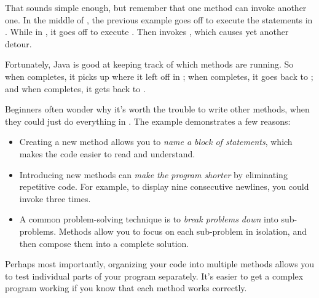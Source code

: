 That sounds simple enough, but remember that one method can invoke another one.
In the middle of , the previous example goes off to execute the statements in .
While in , it goes off to execute .
Then  invokes , which causes yet another detour.

Fortunately, Java is good at keeping track of which methods are running.
So when  completes, it picks up where it left off in ; when  completes, it goes back to ; and when  completes, it gets back to .



Beginners often wonder why it's worth the trouble to write other methods, when they could just do everything in .
The  example demonstrates a few reasons:

\begin{itemize}

\item Creating a new method allows you to {\em name a block of statements}, which makes the code easier to read and understand.

\item Introducing new methods can {\em make the program shorter} by eliminating repetitive code.
For example, to display nine consecutive newlines, you could invoke  three times.

\item A common problem-solving technique is to {\em break problems down} into sub-problems.
Methods allow you to focus on each sub-problem in isolation, and then compose them into a complete solution.

\end{itemize}

Perhaps most importantly, organizing your code into multiple methods allows you to test individual parts of your program separately.
It's easier to get a complex program working if you know that each method works correctly.

